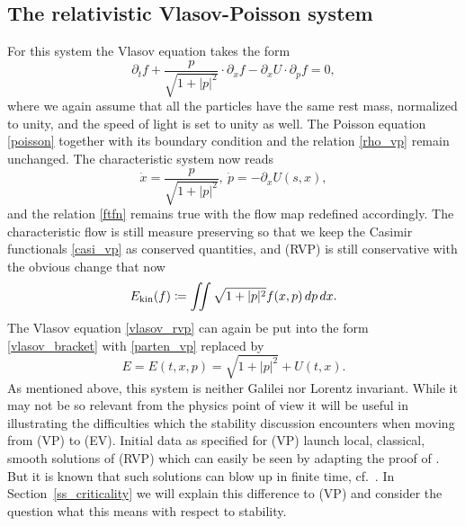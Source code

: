 \documentclass[11pt]{article}
\begin{document}
\subsection{The relativistic Vlasov-Poisson system}\label{ss_rvp}
%
%
For this system the Vlasov equation takes the form
\begin{equation} \label{vlasov_rvp}
  \partial_t f+ \frac{p}{\sqrt{1+|p|^2}}\cdot \partial_x f -
  \partial_x U\cdot\partial_p f = 0,
\end{equation}
where we again assume that all the particles have the same rest mass,
normalized to unity, and the speed of light is set to unity as well.
The Poisson equation \eqref{poisson} together with its boundary condition
and the relation \eqref{rho_vp} remain unchanged.
The characteristic system now reads
\[ 
\dot x = \frac{p}{\sqrt{1+|p|^2}},\ \dot p = -\partial_x U(s,x),
\]
and the relation \eqref{ftfn} remains true with the flow map
redefined accordingly. The characteristic flow is still measure preserving
so that we keep the Casimir functionals \eqref{casi_vp} as conserved
quantities, and (RVP) is still conservative with the obvious
change that now
\[ 
E_\mathrm{kin} (f) 
\coloneqq \iint \sqrt{1+|p|^2} f(x,p)\,dp\,dx.
\]
The Vlasov equation \eqref{vlasov_rvp} can again be put into the form
\eqref{vlasov_bracket} with \eqref{parten_vp} replaced by
\begin{equation}\label{parten_rvp}
  E = E(t,x,p) = \sqrt{1+|p|^2} + U(t,x).
\end{equation}
As mentioned above, this system is neither Galilei nor Lorentz
invariant. While it may not be so relevant from the physics point of view
it will be useful in illustrating the difficulties which the stability
discussion encounters when moving from (VP) to (EV).
Initial data as specified for (VP) launch local, classical, smooth solutions
of (RVP) which can easily be seen by adapting the proof of
\cite[Thm.~1.1]{Rein07}. But it is known that such solutions
can blow up in finite time, cf.~\cite{GlSch}. In Section~\ref{ss_criticality}
we will explain this difference to (VP) and consider the question what
this means with respect to stability.
\end{document}
